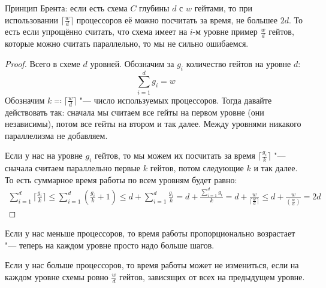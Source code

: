 	\begin{theorem}
		Принцип Брента: если есть схема $C$ глубины $d$ с $w$ гейтами, то при использовании $\lceil \frac{w}{d} \rceil$ процессоров её можно посчитать за время, не большее $2d$.
		То есть если упрощённо считать, что схема имеет на $i$-м уровне пример $\frac{w}{d}$ гейтов, которые можно считать параллельно, то мы не сильно ошибаемся.
	\end{theorem}
	\begin{proof}
		Всего в схеме $d$ уровней.
		Обозначим за $g_i$ количество гейтов на уровне $d$:
		\[ \sum_{i=1}^d g_i = w \]
		Обозначим $k \eqcolon \lceil \frac{w}{d} \rceil$ "--- число используемых процессоров.
		Тогда давайте действовать так: сначала мы считаем все гейты на первом уровне (они независимы), потом все гейты на втором и так далее.
		Между уровнями никакого параллелизма не добавляем.

		Если у нас на уровне $g_i$ гейтов, то мы можем их посчитать за время $\lceil \frac{g_i}{k} \rceil$ "--- сначала считаем параллельно первые $k$ гейтов, потом следующие $k$ и так далее.
		То есть суммарное время работы по всем уровням будет равно:
		\begin{gather*}
			\sum_{i=1}^d \lceil \frac{g_i}{k} \rceil \le
			\sum_{i=1}^d \left(\frac{g_i}{k} + 1\right) \le
			d + \sum_{i=1}^d \frac{g_i}{k} = 
			d + \frac{\sum_{i=1}^d  g_i}{k} = 
			d + \frac{w}{\lceil \frac wd \rceil} \le
			d + \frac{w}{\left(\frac wd\right)} = 2d
		\end{gather*}
	\end{proof}
	\begin{Rem}
		Если у нас меньше процессоров, то время работы пропорционально возрастает "--- теперь на каждом уровне просто надо больше шагов.
	\end{Rem}
	\begin{Rem}
		Если у нас больше процессоров, то время работы может не измениться, если на каждом уровне схемы ровно $\frac{w}{d}$ гейтов, зависящих от всех на предыдущем уровне.
	\end{Rem}

